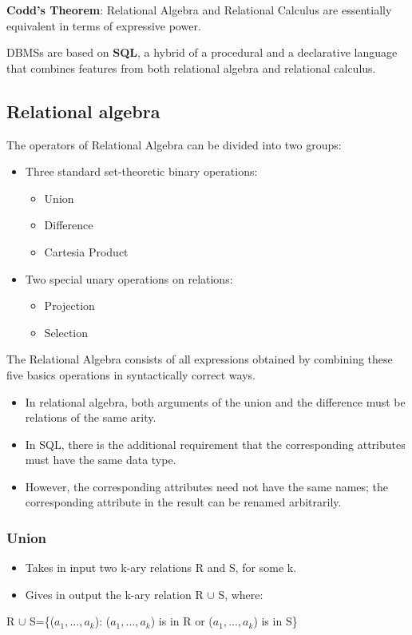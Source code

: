 \textbf{Codd's Theorem}: Relational Algebra and Relational Calculus are essentially equivalent in terms of expressive power.

DBMSs are based on \textbf{SQL}, a hybrid of a procedural and a declarative language that combines features from both relational algebra and relational calculus.

\subsection{Relational algebra}
The operators of Relational Algebra can be divided into two groups:
\begin{itemize}
    \item Three standard set-theoretic binary operations:
        \begin{itemize}
            \item Union
            \item Difference
            \item Cartesia Product
        \end{itemize}
    \item Two special unary operations on relations:
        \begin{itemize}
            \item Projection
            \item Selection
        \end{itemize}
\end{itemize}

The Relational Algebra consists of all expressions obtained by combining these five basics operations in syntactically correct ways.

\begin{itemize}
    \item In relational algebra, both arguments of the union and the difference must be relations of the same arity.
    \item In SQL, there is the additional requirement that the corresponding attributes must have the same data type.
    \item However, the corresponding attributes need not have the same names; the corresponding attribute in the result can be renamed arbitrarily.
\end{itemize}

\subsubsection{Union}
\begin{itemize}
    \item Takes in input two k-ary relations R and S, for some k.
    \item Gives in output the k-ary relation R $\cup$ S, where:
\end{itemize}
R $\cup$ S=\{($a_1,...,a_k$): ($a_1,...,a_k$) is in R or ($a_1,...,a_k$) is in S\} 


